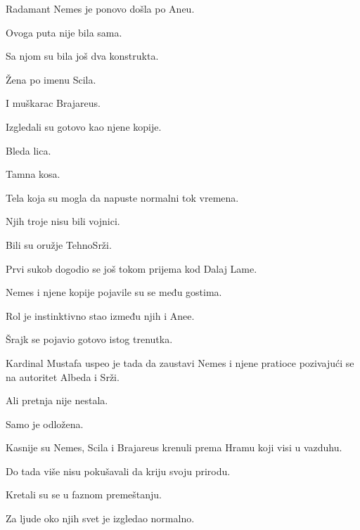 Radamant Nemes je ponovo došla po Aneu.

\bigskip

Ovoga puta nije bila sama.

\bigskip

Sa njom su bila još dva konstrukta.

Žena po imenu Scila.

I muškarac Brajareus.

\bigskip

Izgledali su gotovo kao njene kopije.

\bigskip

Bleda lica.

Tamna kosa.

Tela koja su mogla da napuste normalni tok vremena.

\bigskip

Njih troje nisu bili vojnici.

\bigskip

Bili su oružje TehnoSrži.

\bigskip

Prvi sukob dogodio se još tokom prijema kod Dalaj Lame.

\bigskip

Nemes i njene kopije pojavile su se među gostima.

\bigskip

Rol je instinktivno stao između njih i Anee.

\bigskip

Šrajk se pojavio gotovo istog trenutka.

\bigskip

Kardinal Mustafa uspeo je tada da zaustavi Nemes i njene pratioce pozivajući se na autoritet Albeda i Srži.

\bigskip

Ali pretnja nije nestala.

\bigskip

Samo je odložena.

\bigskip

Kasnije su Nemes, Scila i Brajareus krenuli prema Hramu koji visi u vazduhu.

\bigskip

Do tada više nisu pokušavali da kriju svoju prirodu.

\bigskip

Kretali su se u faznom premeštanju.

\bigskip

Za ljude oko njih svet je izgledao normalno.

